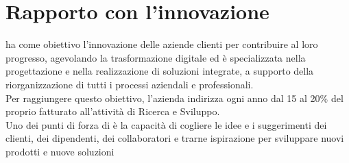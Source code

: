 \newpage
\section{Rapporto con l'innovazione}

{\azienda} ha come obiettivo l’innovazione delle aziende clienti per contribuire al loro progresso, 
agevolando la trasformazione digitale ed è specializzata nella progettazione e nella realizzazione di soluzioni integrate, 
a supporto della riorganizzazione di tutti i processi aziendali e professionali.\\
Per raggiungere questo obiettivo, l'azienda indirizza ogni anno dal 15 al 20\% del proprio fatturato all’attività di Ricerca e Sviluppo.\\
Uno dei punti di forza di {\azienda} è la capacità di cogliere le idee e i suggerimenti dei clienti, dei dipendenti, dei collaboratori e trarne ispirazione per sviluppare nuovi prodotti e nuove soluzioni